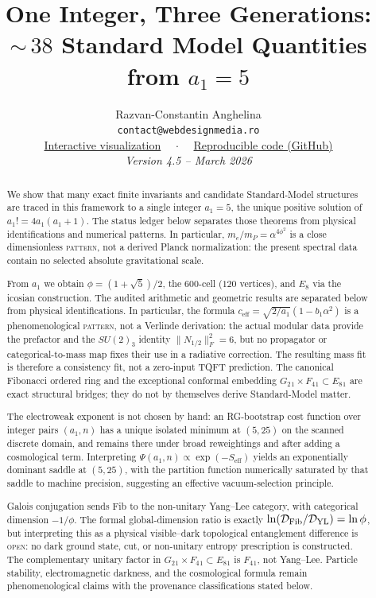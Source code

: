 \documentclass[12pt,a4paper]{article}
\title{\textbf{One Integer, Three Generations:\\
${\sim}\,38$ Standard Model Quantities from $a_1 = 5$}}
\author{
Razvan-Constantin Anghelina\\
\texttt{contact@webdesignmedia.ro}\\[0.3em]
\href{https://webdesignmedia.ro/hjer_particles/}{Interactive visualization} ~~$\cdot$~~ \href{https://github.com/razvananghelina/One-Integer-Three-Generations}{Reproducible code (GitHub)}\\[1em]
\textit{Version 4.5 -- March 2026}
}
\date{}
\theoremstyle{definition}
\begin{document}
\maketitle

\begin{abstract}
We show that many exact finite invariants and candidate Standard-Model
structures are traced in this framework to a single integer $a_1=5$, the
unique positive solution of $a_1!=4a_1(a_1+1)$.  The status ledger below
separates those theorems from physical identifications and numerical
patterns.  In particular, $m_e/m_P=\alpha^{4\phi^2}$ is a close dimensionless
\textsc{pattern}, not a derived Planck normalization: the present spectral
data contain no selected absolute gravitational scale.

From $a_1$ we obtain $\phi = (1+\sqrt{5})/2$, the 600-cell ($120$ vertices), and $E_8$ via the icosian construction.  The audited arithmetic and geometric results are separated below from physical identifications.  In particular, the formula $c_{\mathrm{eff}} = \sqrt{2/a_1}(1-b_1\alpha^2)$ is a phenomenological \textsc{pattern}, not a Verlinde derivation: the actual modular data provide the prefactor and the $SU(2)_3$ identity $\|N_{1/2}\|_F^2=6$, but no propagator or categorical-to-mass map fixes their use in a radiative correction.  The resulting mass fit is therefore a consistency fit, not a zero-input TQFT prediction.  The canonical Fibonacci ordered ring and the exceptional conformal embedding $G_2{}_1\times F_4{}_1\subset E_8{}_1$ are exact structural bridges; they do not by themselves derive Standard-Model matter.

The electroweak exponent is not chosen by hand: an RG-bootstrap cost function over integer pairs $(a_1,n)$ has a unique isolated minimum at $(5,25)$ on the scanned discrete domain, and remains there under broad reweightings and after adding a cosmological term.  Interpreting $\Psi(a_1,n) \propto \exp(-S_{\mathrm{eff}})$ yields an exponentially dominant saddle at $(5,25)$, with the partition function numerically saturated by that saddle to machine precision, suggesting an effective vacuum-selection principle.

Galois conjugation sends Fib to the non-unitary Yang--Lee category, with categorical dimension $-1/\phi$.  The formal global-dimension ratio is exactly $\ln(\mathcal D_{\rm Fib}/\mathcal D_{\rm YL})=\ln\phi$, but interpreting this as a physical visible--dark topological entanglement difference is \textsc{open}: no dark ground state, cut, or non-unitary entropy prescription is constructed.  The complementary unitary factor in $G_2{}_1\times F_4{}_1\subset E_8{}_1$ is $F_4{}_1$, not Yang--Lee.  Particle stability, electromagnetic darkness, and the cosmological formula remain phenomenological claims with the provenance classifications stated below.


\end{abstract}
\end{document}
